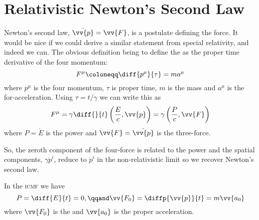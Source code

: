 \documentclass[fleqn]{NotesClass}
\newcommand{\ICMF}{\textsc{icmf}}
\begin{document}
    \section{Relativistic Newton's Second Law}
    Newton's second law, \(\dot{\vv{p}} = \vv{F}\), is a postulate defining the force.
    It would be nice if we could derive a similar statement from special relativity, and indeed we can.
    The obvious definition being to define the  as the proper time derivative of the four momentum:
    \begin{equation}
        F^\mu \coloneqq \diff{p^\mu}{\tau} = ma^\mu
    \end{equation}
    where \(p^\mu\) is the four momentum, \(\tau\) is proper time, \(m\) is the mass and \(a^\mu\) is the for-acceleration.
    Using \(\tau = t/\gamma\) we can write this as
    \begin{equation}
        F^\mu = \gamma \diff{}{t}\left( \frac{E}{c}, \vv{p} \right) = \gamma\left( \frac{P}{c}, \vv{F} \right)
    \end{equation}
    where \(P = \dot{E}\) is the power and \(\vv{F} = \dot{\vv{p}}\) is the three-force.
    
    So, the zeroth component of the four-force is related to the power and the spatial components, \(\gamma \dot{p}^i\), reduce to \(\dot{p}^i\) in the non-relativistic limit so we recover Newton's second law.
    
    In the \ICMF{} we have
    \begin{equation}
        P = \diff{E}{t} = 0, \qqand \vv{F_0} = \diffp{\vv{p}}{t} = m\vv{a_0}
    \end{equation}
    where \(\vv{F_0}\) is the  and \(\vv{a_0}\) is the proper acceleration.
    
\end{document}
